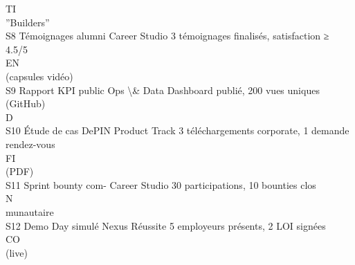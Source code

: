 \documentclass[12pt,landscape,a4paper]{article}
\begin{document}
\vspace{0.5em}
\vspace{0.5em}
\vspace{0.5em}
\vspace{0.5em}
TI\\
”Builders”\\
S8         Témoignages alumni Career Studio           3 témoignages finalisés, satisfaction ≥ 4.5/5\\
\vspace{0.5em}
\vspace{0.5em}
\vspace{0.5em}
\vspace{0.5em}
EN\\
(capsules vidéo)\\
S9         Rapport KPI public Ops \textbackslash{}& Data              Dashboard publié, 200 vues uniques\\
(GitHub)\\
\vspace{0.5em}
\vspace{0.5em}
\vspace{0.5em}
\vspace{0.5em}
D\\
S10        Étude de cas DePIN Product Track           3 téléchargements corporate, 1 demande rendez-vous\\
\vspace{0.5em}
\vspace{0.5em}
\vspace{0.5em}
\vspace{0.5em}
FI\\
(PDF)\\
S11        Sprint bounty com- Career Studio           30 participations, 10 bounties clos\\
\vspace{0.5em}
\vspace{0.5em}
\vspace{0.5em}
N\\
munautaire\\
S12        Demo Day simulé Nexus Réussite             5 employeurs présents, 2 LOI signées\\
CO\\
(live)\\
\vspace{0.5em}
\vspace{0.5em}
\vspace{0.5em}
\vspace{0.5em}
\end{document}

